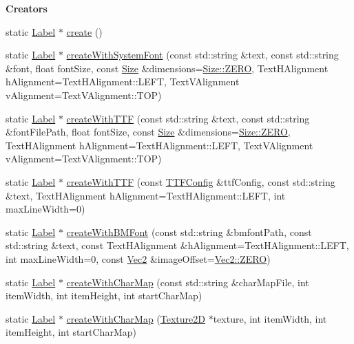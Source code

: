\begin{Indent}\textbf{ Creators}\par
\begin{DoxyCompactItemize}
\item 
static \hyperlink{classLabel}{Label} $\ast$ \hyperlink{classLabel_a9e20a505142eec1c1a4315ddba0d56b5}{create} ()
\item 
static \hyperlink{classLabel}{Label} $\ast$ \hyperlink{classLabel_a2398a326a386a120f852ea1be924d11e}{create\+With\+System\+Font} (const std\+::string \&text, const std\+::string \&font, float font\+Size, const \hyperlink{classSize}{Size} \&dimensions=\hyperlink{classSize_a724334f12c8ef877c36b3f69e1257aa7}{Size\+::\+Z\+E\+RO}, Text\+H\+Alignment h\+Alignment=Text\+H\+Alignment\+::\+L\+E\+FT, Text\+V\+Alignment v\+Alignment=Text\+V\+Alignment\+::\+T\+OP)
\item 
static \hyperlink{classLabel}{Label} $\ast$ \hyperlink{classLabel_aae358392795664912d4048b1bc38c674}{create\+With\+T\+TF} (const std\+::string \&text, const std\+::string \&font\+File\+Path, float font\+Size, const \hyperlink{classSize}{Size} \&dimensions=\hyperlink{classSize_a724334f12c8ef877c36b3f69e1257aa7}{Size\+::\+Z\+E\+RO}, Text\+H\+Alignment h\+Alignment=Text\+H\+Alignment\+::\+L\+E\+FT, Text\+V\+Alignment v\+Alignment=Text\+V\+Alignment\+::\+T\+OP)
\item 
static \hyperlink{classLabel}{Label} $\ast$ \hyperlink{classLabel_a8e2ee86506be3752723cd34ae892442e}{create\+With\+T\+TF} (const \hyperlink{structTTFConfig}{T\+T\+F\+Config} \&ttf\+Config, const std\+::string \&text, Text\+H\+Alignment h\+Alignment=Text\+H\+Alignment\+::\+L\+E\+FT, int max\+Line\+Width=0)
\item 
static \hyperlink{classLabel}{Label} $\ast$ \hyperlink{classLabel_a15adf4af0d7f68599e4aa905c8609574}{create\+With\+B\+M\+Font} (const std\+::string \&bmfont\+Path, const std\+::string \&text, const Text\+H\+Alignment \&h\+Alignment=Text\+H\+Alignment\+::\+L\+E\+FT, int max\+Line\+Width=0, const \hyperlink{classVec2}{Vec2} \&image\+Offset=\hyperlink{classVec2_a5c80e2e7c8bd2adcbad2844d060e6245}{Vec2\+::\+Z\+E\+RO})
\item 
static \hyperlink{classLabel}{Label} $\ast$ \hyperlink{classLabel_a96c96d48eb5969f2fe3ab396b53905e1}{create\+With\+Char\+Map} (const std\+::string \&char\+Map\+File, int item\+Width, int item\+Height, int start\+Char\+Map)
\item 
static \hyperlink{classLabel}{Label} $\ast$ \hyperlink{classLabel_aea282c2c84fc975f7eb51af463f1d46b}{create\+With\+Char\+Map} (\hyperlink{classTexture2D}{Texture2D} $\ast$texture, int item\+Width, int item\+Height, int start\+Char\+Map)

\end{DoxyCompactItemize}
\end{Indent}

